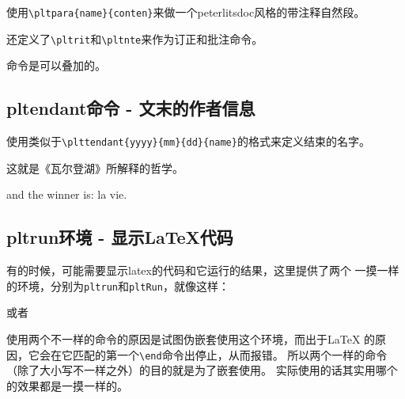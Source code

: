 \documentclass{../src/peterlitsdoc}
\newcommand{\vb}{\verb}
\begin{document}
使用\vb|\pltpara{name}{conten}|来做一个peterlitsdoc风格的带注释自然段。
\begin{pltrun}
\end{pltrun}

还定义了\vb|\pltrit|和\verb|\pltnte|来作为订正和批注命令。
\begin{pltrun}
\end{pltrun}

命令是可以叠加的。
\begin{pltrun}
\end{pltrun}


\subsection{pltendant命令 - 文末的作者信息}

使用类似于\vb|\plttendant{yyyy}{mm}{dd}{name}|的格式来定义结束的名字。
\begin{pltrun}
这就是《瓦尔登湖》所解释的哲学。

and the winner is: la vie.

\end{pltrun}


\subsection{pltrun环境 - 显示\LaTeX{}代码}

有的时候，可能需要显示latex的代码和它运行的结果，这里提供了两个
一摸一样的环境，分别为\vb|pltrun|和\verb|pltRun|，就像这样：
\begin{pltRun}
\begin{pltrun}
\end{pltrun}
\end{pltRun}
或者
\begin{pltrun}
\begin{pltRun}
\end{pltRun}
\end{pltrun}

使用两个不一样的命令的原因是试图伪嵌套使用这个环境，而出于\LaTeX
的原因，它会在它匹配的第一个\vb|\end|命令出停止，从而报错。
所以两个一样的命令（除了大小写不一样之外）的目的就是为了嵌套使用。
实际使用的话其实用哪个的效果都是一摸一样的。
\end{document}
